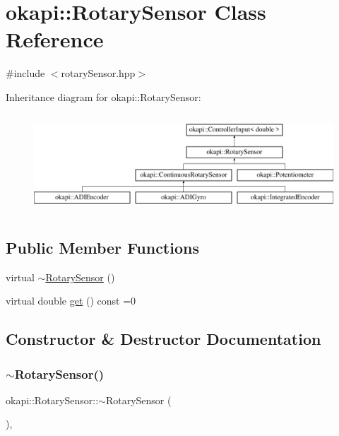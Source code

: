 \hypertarget{classokapi_1_1RotarySensor}{}\section{okapi\+::Rotary\+Sensor Class Reference}
\label{classokapi_1_1RotarySensor}


{\ttfamily \#include $<$rotary\+Sensor.\+hpp$>$}

Inheritance diagram for okapi\+::Rotary\+Sensor\+:\begin{figure}[H]
\begin{center}
\leavevmode
\includegraphics[height=3.714760cm]{classokapi_1_1RotarySensor}
\end{center}
\end{figure}
\subsection*{Public Member Functions}
\begin{DoxyCompactItemize}
\item 
virtual \mbox{\hyperlink{classokapi_1_1RotarySensor_ad34ebb82ce8e5487a286ce95c1aad086}{$\sim$\+Rotary\+Sensor}} ()
\item 
virtual double \mbox{\hyperlink{classokapi_1_1RotarySensor_ac5534dc6c3bcbd8ea2f4e54a04cda734}{get}} () const =0
\end{DoxyCompactItemize}


\subsection{Constructor \& Destructor Documentation}
\mbox{\label{classokapi_1_1RotarySensor_ad34ebb82ce8e5487a286ce95c1aad086}} 
\subsubsection{\texorpdfstring{$\sim$RotarySensor()}{~RotarySensor()}}
{\footnotesize\ttfamily okapi\+::\+Rotary\+Sensor\+::$\sim$\+Rotary\+Sensor (\begin{DoxyParamCaption}{ }\end{DoxyParamCaption})\hspace{0.3cm}{\ttfamily [virtual]}, {\ttfamily [default]}}



